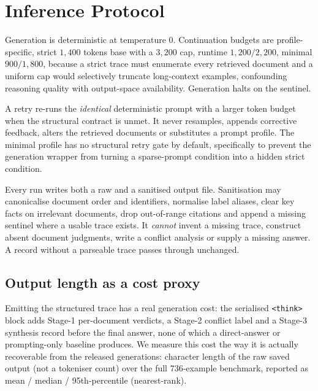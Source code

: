 \section{Inference Protocol}
\label{app:inference}

Generation is deterministic at temperature $0$. Continuation budgets are
profile-specific, strict $1{,}400$ tokens base with a $3{,}200$ cap, runtime
$1{,}200/2{,}200$, minimal $900/1{,}800$, because a strict trace must enumerate
every retrieved document and a uniform cap would selectively truncate
long-context examples, confounding reasoning quality with output-space
availability. Generation halts on the sentinel.

A retry re-runs the \emph{identical} deterministic prompt with a larger token
budget when the structural contract is unmet. It never resamples, appends
corrective feedback, alters the retrieved documents or substitutes a prompt
profile. The minimal profile has no structural retry gate by default,
specifically to prevent the generation wrapper from turning a sparse-prompt
condition into a hidden strict condition.

Every run writes both a raw and a sanitised output file. Sanitisation may
canonicalise document order and identifiers, normalise label aliases, clear key
facts on irrelevant documents, drop out-of-range citations and append a missing
sentinel where a usable trace exists. It \emph{cannot} invent a missing trace,
construct absent document judgments, write a conflict analysis or supply a
missing answer. A record without a parseable trace passes through unchanged.

\subsection{Output length as a cost proxy}
\label{app:inflatency}

Emitting the structured trace has a real generation cost: the serialised
\texttt{<think>} block adds Stage-1 per-document verdicts, a Stage-2 conflict
label and a Stage-3 synthesis record before the final answer, none of which a
direct-answer or prompting-only baseline produces. We measure this cost the
way it is actually recoverable from the released generations: character
length of the raw saved output (not a tokeniser count) over the full
736-example benchmark, reported as mean / median / 95th-percentile
(nearest-rank).

\begin{table}[htbp]\centering

\caption{\textbf{Output length by supervision condition}, characters over the 736-example benchmark under the minimal prompt. Qwen2.5-32B's answer-only raw generations were not retained.}
\label{tab:outputlength}
\end{table}

